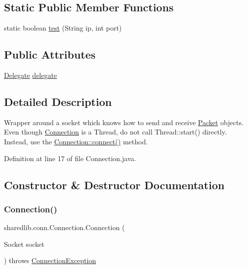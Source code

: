 \subsection*{Static Public Member Functions}
\begin{DoxyCompactItemize}
\item 
static boolean \hyperlink{classsharedlib_1_1conn_1_1_connection_ace052367dd9ca3e1462baea961c9efda}{test} (String ip, int port)
\end{DoxyCompactItemize}
\subsection*{Public Attributes}
\begin{DoxyCompactItemize}
\item 
\hyperlink{interfacesharedlib_1_1conn_1_1_connection_1_1_delegate}{Delegate} \hyperlink{classsharedlib_1_1conn_1_1_connection_aac9b160ef28ec9d71662318b969decb6}{delegate}
\end{DoxyCompactItemize}


\subsection{Detailed Description}
Wrapper around a socket which knows how to send and receive \hyperlink{classsharedlib_1_1conn_1_1_packet}{Packet} objects. Even though \hyperlink{classsharedlib_1_1conn_1_1_connection}{Connection} is a Thread, do not call Thread\+::start() directly. Instead, use the \hyperlink{classsharedlib_1_1conn_1_1_connection_a9a8ee0f703a3c867d5630edb02779847}{Connection\+::connect()} method. 

Definition at line 17 of file Connection.\+java.



\subsection{Constructor \& Destructor Documentation}
\hypertarget{classsharedlib_1_1conn_1_1_connection_a36c23c1d5d4388af57c3b97b42aa69c2}{}\label{classsharedlib_1_1conn_1_1_connection_a36c23c1d5d4388af57c3b97b42aa69c2} 
\subsubsection{\texorpdfstring{Connection()}{Connection()}}
{\footnotesize\ttfamily sharedlib.\+conn.\+Connection.\+Connection (\begin{DoxyParamCaption}\item[{Socket}]{socket }\end{DoxyParamCaption}) throws \hyperlink{classsharedlib_1_1exceptions_1_1_connection_exception}{Connection\+Exception}}

